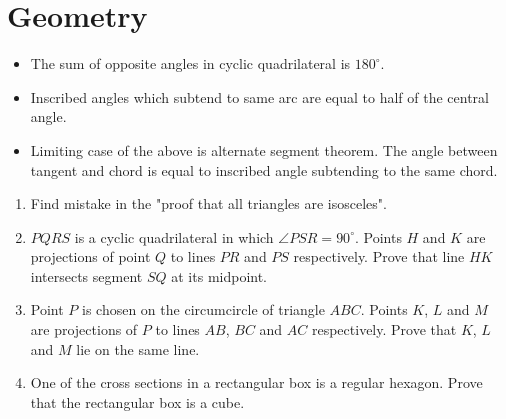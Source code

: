 \documentclass{article}
\begin{document}
	\section{Geometry}
	\begin{itemize}
	\item
	The sum of opposite angles in cyclic quadrilateral is $180^\circ$.
	\item
	Inscribed angles which subtend to same arc are equal to half of the central angle. 
	\item
	Limiting case of the above is alternate segment theorem. The angle between tangent and chord is equal to inscribed angle subtending to the same chord.
	\end{itemize}
	
	
	\begin{enumerate}
		\item
		Find mistake in the "proof that all triangles are isosceles".
		
		\item %
		$PQRS$ is a cyclic quadrilateral in which $\angle PSR = 90^\circ$. Points $H$ and $K$ are projections of point $Q$ to lines $PR$ and $PS$ respectively. Prove that line $HK$ intersects segment $SQ$ at its midpoint.
		
		\item %
		Point $P$ is chosen on the circumcircle of triangle $ABC$. Points $K$, $L$ and $M$ are projections of $P$ to lines $AB$, $BC$ and $AC$ respectively. Prove that $K$, $L$ and $M$ lie on the same line.
  		
		\item %
		One of the cross sections in a rectangular box is a regular hexagon. Prove that the rectangular box is a cube.
		

	\end{enumerate}
\end{document}
